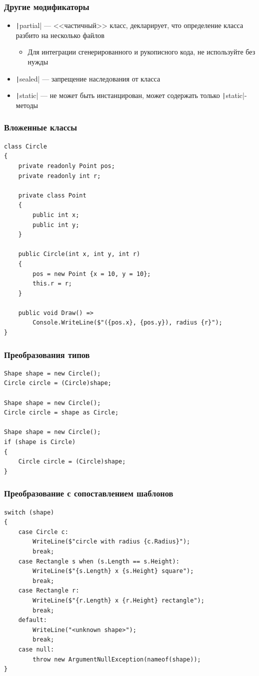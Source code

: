 \documentclass[xetex,mathserif,serif]{beamer}
\begin{document}
	\begin{frame}
		\frametitle{Другие модификаторы}
		\begin{itemize}
			\item \texttt|partial| --- <<частичный>> класс, декларирует, что определение класса разбито на несколько файлов
			\begin{itemize}
				\item Для интеграции сгенерированного и рукописного кода, не используйте без нужды
			\end{itemize}
			\item \texttt|sealed| --- запрещение наследования от класса
			\item \texttt|static| --- не может быть инстанцирован, может содержать только \texttt|static|-методы
		\end{itemize}
	\end{frame}

	\begin{frame}[fragile]
		\frametitle{Вложенные классы}
		\begin{scriptsize}
			\begin{verbatim}
class Circle
{
    private readonly Point pos;
    private readonly int r;

    private class Point
    {
        public int x;
        public int y;
    }

    public Circle(int x, int y, int r)
    {
        pos = new Point {x = 10, y = 10};
        this.r = r;
    }

    public void Draw() =>
        Console.WriteLine($"({pos.x}, {pos.y}), radius {r}");
}
			\end{verbatim}
		\end{scriptsize}
\end{frame}

	\begin{frame}[fragile]
		\frametitle{Преобразования типов}
		\begin{verbatim}
Shape shape = new Circle();
Circle circle = (Circle)shape;

Shape shape = new Circle();
Circle circle = shape as Circle;

Shape shape = new Circle();
if (shape is Circle)
{
    Circle circle = (Circle)shape;
}
		\end{verbatim}
\end{frame}

	\begin{frame}[fragile]
		\frametitle{Преобразование с сопоставлением шаблонов}
		\begin{small}
			\begin{verbatim}
switch (shape)
{
    case Circle c:
        WriteLine($"circle with radius {c.Radius}");
        break;
    case Rectangle s when (s.Length == s.Height):
        WriteLine($"{s.Length} x {s.Height} square");
        break;
    case Rectangle r:
        WriteLine($"{r.Length} x {r.Height} rectangle");
        break;
    default:
        WriteLine("<unknown shape>");
        break;
    case null:
        throw new ArgumentNullException(nameof(shape));
}
			\end{verbatim}
		\end{small}
\end{frame}
\end{document}
